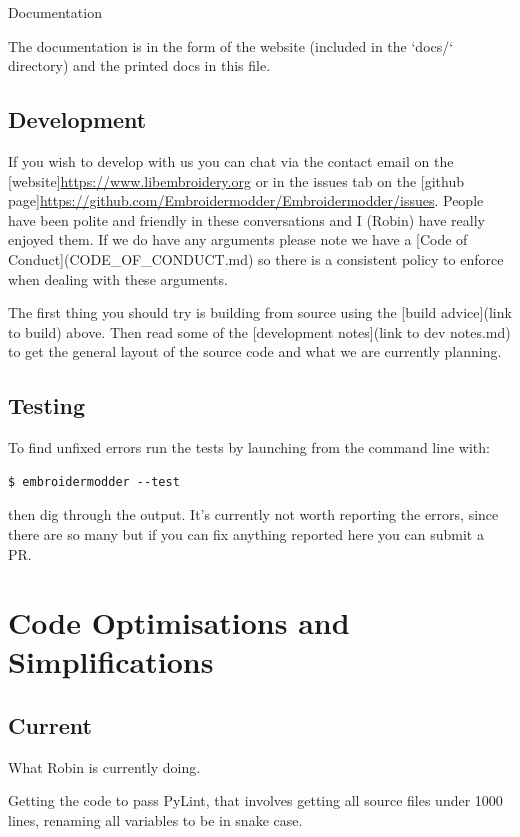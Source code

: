 \documentclass{report}
\begin{document}
Documentation

The documentation is in the form of the website (included in the `docs/`
directory) and the printed docs in this file.

\subsection{Development}

If you wish to develop with us you can chat via the contact email
on the [website]\url{https://www.libembroidery.org} or in the issues tab on the
[github page]\url{https://github.com/Embroidermodder/Embroidermodder/issues}.
People have been polite and friendly in these conversations and I (Robin)
have really enjoyed them.
If we do have any arguments please note we have a
[Code of Conduct](CODE\_OF\_CONDUCT.md) so there is a consistent policy to
enforce when dealing with these arguments.

The first thing you should try is building from source using the [build advice](link to build)
above. Then read some of the [development notes](link to dev notes.md) to get the general
layout of the source code and what we are currently planning.

\subsection{Testing}

To find unfixed errors run the tests by launching from the command line with:

\begin{lstlisting}
$ embroidermodder --test
\end{lstlisting}

then dig through the output. It's currently not worth reporting the errors, since
there are so many but if you can fix anything reported here you can submit a PR.

\section{Code Optimisations and Simplifications}

\subsection{Current}

What Robin is currently doing.

Getting the code to pass PyLint, that involves getting all source files
under 1000 lines, renaming all variables to be in snake case.
\end{document}
